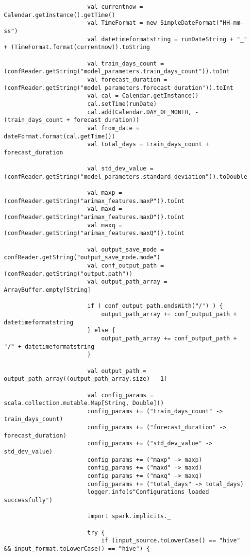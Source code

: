 \documentclass[12pt]{article}
\begin{document}
\begin{lstlisting}
       					val currentnow = Calendar.getInstance().getTime()
       					val TimeFormat = new SimpleDateFormat("HH-mm-ss")
       					val datetimeformatstring = runDateString + "_" + (TimeFormat.format(currentnow)).toString
    
       					val train_days_count = (confReader.getString("model_parameters.train_days_count")).toInt
       					val forecast_duration = (confReader.getString("model_parameters.forecast_duration")).toInt
       					val cal = Calendar.getInstance()
       					cal.setTime(runDate)
       					cal.add(Calendar.DAY_OF_MONTH, -(train_days_count + forecast_duration))
       					val from_date = dateFormat.format(cal.getTime())
       					val total_days = train_days_count + forecast_duration
    
       					val std_dev_value = (confReader.getString("model_parameters.standard_deviation")).toDouble
    
       					val maxp = (confReader.getString("arimax_features.maxP")).toInt
       					val maxd = (confReader.getString("arimax_features.maxD")).toInt
       					val maxq = (confReader.getString("arimax_features.maxQ")).toInt
    
       					val output_save_mode = confReader.getString("output_save_mode.mode")
       					val conf_output_path = (confReader.getString("output.path"))
       					val output_path_array = ArrayBuffer.empty[String]
    
       					if ( conf_output_path.endsWith("/") ) {
       						output_path_array += conf_output_path + datetimeformatstring
       					} else {
       						output_path_array += conf_output_path + "/" + datetimeformatstring
       					}
    
       					val output_path = output_path_array((output_path_array.size) - 1)
    
       					val config_params = scala.collection.mutable.Map[String, Double]()
       					config_params += ("train_days_count" -> train_days_count)
       					config_params += ("forecast_duration" -> forecast_duration)
       					config_params += ("std_dev_value" -> std_dev_value)
       					config_params += ("maxp" -> maxp)
       					config_params += ("maxd" -> maxd)
       					config_params += ("maxq" -> maxq)
       					config_params += ("total_days" -> total_days)
       					logger.info(s"Configurations loaded successfully")
    
       					import spark.implicits._
    
       					try {
       						if (input_source.toLowerCase() == "hive" && input_format.toLowerCase() == "hive") {
    

\end{lstlisting}
\end{document}

